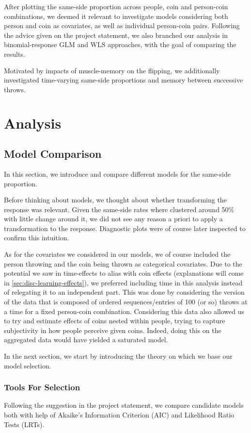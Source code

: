 \documentclass[a4paper, 12pt,oneside]{article}
\begin{document}
		After plotting the same-side proportion across people, coin and person-coin combinations, we deemed it relevant to investigate models considering both person and coin as covariates, as well as individual person-coin pairs. Following the advice given on the project statement, we also branched our analysis in binomial-response GLM and WLS approaches, with the goal of comparing the results. 

		Motivated by impacts of muscle-memory on the flipping, we additionally investigated time-varying same-side proportions and memory between successive throws.
	\section{Analysis}
		\subsection{Model Comparison}
			In this section, we introduce and compare different models for the same-side proportion. 

			Before thinking about models, we thought about whether transforming the response was relevant. Given the same-side rates where clustered around 50\% with little change around it, we did not see any reason a priori to apply a transformation to the response. Diagnostic plots were of course later inspected to confirm this intuition.
			
			As for the covariates we considered in our models, we of course included the person throwing and the coin being thrown as categorical covariates. Due to the potential we saw in time-effects to alias with coin effects (explanations will come in \ref{sec:disc-learning-effects}), we preferred including time in this analysis instead of relegating it to an independent part. This was done by considering the version of the data that is composed of ordered sequences/entries of 100 (or so) throws at a time for a fixed person-coin combination. Considering this data also allowed us to try and estimate effects of coins nested within people, trying to capture subjectivity in how people perceive given coins. Indeed, doing this on the aggregated data would have yielded a saturated model. 

			In the next section, we start by introducing the theory on which we base our model selection. 
			\subsubsection{Tools For Selection}
				Following the suggestion in the project statement, we compare candidate models both with help of Akaike's Information Criterion (AIC) and Likelihood Ratio Tests (LRTs). 
\end{document}
